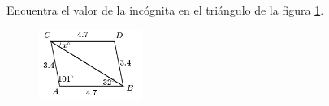 \question[10]  Encuentra el valor de la incógnita en el triángulo de la figura \ref{fig:angle_triangle_01}.
\begin{figure}[H]
    \begin{center}
        \includegraphics[width=0.3\textwidth]{../images/angle_triangle_01.png}
    \end{center}
    \caption{}
    \label{fig:angle_triangle_01}
\end{figure}